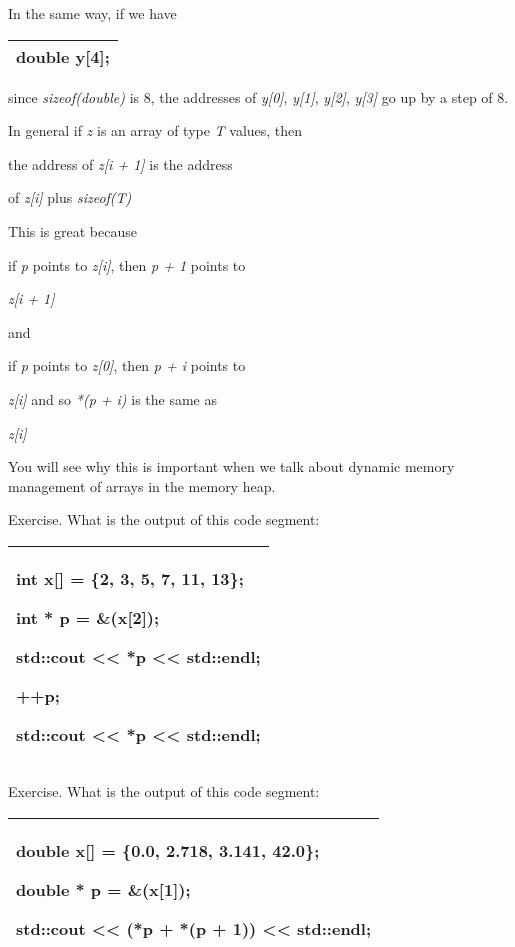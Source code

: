 \documentclass[
]{article}
\begin{document}
In the same way, if we have

\begin{longtable}[]{@{}l@{}}
\toprule
\endhead
double y{[}4{]};\tabularnewline
\bottomrule
\end{longtable}

since \emph{sizeof(double)} is 8, the addresses of \emph{y{[}0{]}},
\emph{y{[}1{]}}, \emph{y{[}2{]}}, \emph{y{[}3{]}} go up by a step of 8.

In general if \emph{z} is an array of type \emph{T} values, then

the address of \emph{z{[}i + 1{]}} is the address

of \emph{z{[}i{]}} plus \emph{sizeof(T)}

This is great because

if \emph{p} points to \emph{z{[}i{]}}, then \emph{p + 1} points to

\emph{z{[}i + 1{]}}

and

if \emph{p} points to \emph{z{[}0{]}}, then \emph{p + i} points to

\emph{z{[}i{]}} and so \emph{*(p + i)} is the same as

\emph{z{[}i{]}}

You will see why this is important when we talk about dynamic memory
management of arrays in the memory heap.

Exercise. What is the output of this code segment:

\begin{longtable}[]{@{}l@{}}
\toprule
\endhead
\begin{minipage}[t]{0.97\columnwidth}\raggedright
int x{[}{]} = \{2, 3, 5, 7, 11, 13\};

int * p = \&(x{[}2{]});

std::cout \textless\textless{} *p \textless\textless{} std::endl;

++p;

std::cout \textless\textless{} *p \textless\textless{} std::endl;\strut
\end{minipage}\tabularnewline
\bottomrule
\end{longtable}

Exercise. What is the output of this code segment:

\begin{longtable}[]{@{}l@{}}
\toprule
\endhead
\begin{minipage}[t]{0.97\columnwidth}\raggedright
double x{[}{]} = \{0.0, 2.718, 3.141, 42.0\};

double * p = \&(x{[}1{]});

std::cout \textless\textless{} (*p + *(p + 1)) \textless\textless{}
std::endl;\strut
\end{minipage}\tabularnewline
\bottomrule
\end{longtable}
\end{document}
